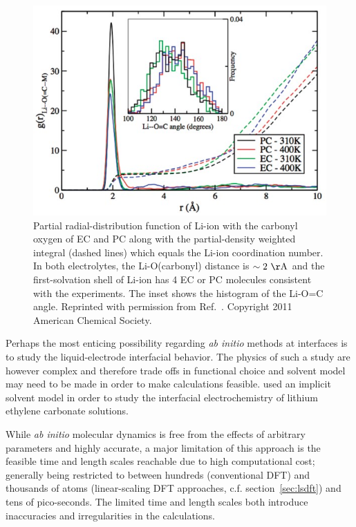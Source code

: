 \documentclass[../main.tex]{subfiles}
\begin{document}
\begin{figure}
    \centering
    \includegraphics[scale=0.5]{figures/aimda.jpg}
    \caption{Partial radial-distribution function of Li-ion with the carbonyl oxygen of EC and PC along with the partial-density weighted integral (dashed lines) which equals the Li-ion coordination number. In both electrolytes, the Li-O(carbonyl) distance is $\rm \sim2~\AA$ and the first-solvation shell of Li-ion has 4 EC or PC molecules consistent with the experiments. The inset shows the histogram of the Li-O=C angle. Reprinted with permission from Ref.~. Copyright 2011 American Chemical Society.}
    \label{fig:leaimda}
\end{figure}

Perhaps the most enticing possibility regarding \textit{ab initio} methods at interfaces is to study the liquid-electrode interfacial behavior. The physics of such a study are however complex and therefore trade offs in functional choice and solvent model may need to be made in order to make calculations feasible. \citeauthor{lespes2015using} used an implicit solvent model in order to study the interfacial electrochemistry of lithium ethylene carbonate solutions\cite{lespes2015using}.

While \textit{ab initio} molecular dynamics is free from the effects of arbitrary parameters and highly accurate, a major limitation of this approach is the feasible time and length scales reachable due to high computational cost; generally being restricted to between hundreds (conventional DFT) and thousands of atoms (linear-scaling DFT approaches, c.f. section~\ref{sec:lsdft}) and tens of pico-seconds. The limited time and length scales both introduce inaccuracies and irregularities in the calculations. 
\end{document}
